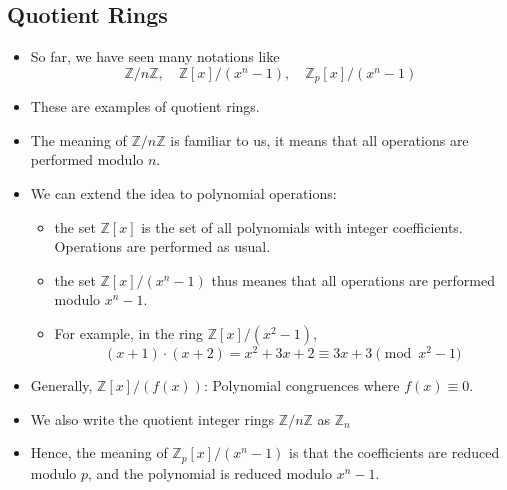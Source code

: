 \subsection{Quotient Rings}
\begin{frame}
    \begin{itemize}
        \item <1->So far, we have seen many notations like 
            \[ \mathbb{Z}/ n\mathbb{Z}, \quad \mathbb{Z}[x]/(x^n - 1), \quad \mathbb{Z}_{p}[x]/(x^n - 1)  \]
        \item <2->These are examples of quotient rings. 
        \item <3->The meaning of \( \mathbb{Z}/n\mathbb{Z} \) is familiar to us, 
              it means that all operations are performed modulo \(n\).
        \item <4->We can extend the idea to polynomial operations: 
              \begin{itemize}
                   \item the set \( \mathbb{Z}[x] \) is the set of all polynomials 
                         with integer coefficients. 
                         Operations are performed as usual.
                   \item the set \( \mathbb{Z}[x]/(x^n - 1) \) thus meanes that 
                         all operations are performed modulo \(x^n - 1\).
                   \item For example, in the ring \( \mathbb{Z}[x]/(x^2 - 1) \), 
                       \[ (x + 1) \cdot (x + 2) = x^2 + 3x + 2 \equiv 3x + 3 \pmod{x^2 - 1} \]
              \end{itemize}
 
        \item <5->Generally, \(\mathbb{Z}[x]/(f(x))\): Polynomial congruences where \(f(x) \equiv 0\).
        \item <6->We also write the quotient integer rings \(\mathbb{Z} / n\mathbb{Z}\) as \(\mathbb{Z}_n\)
        \item <7->Hence, the meaning of \(\mathbb{Z}_{p}[x]/(x^n - 1)\) 
              is that the coefficients are reduced modulo \(p\),
              and the polynomial is reduced modulo \(x^n - 1\).
  \end{itemize}
\end{frame}


